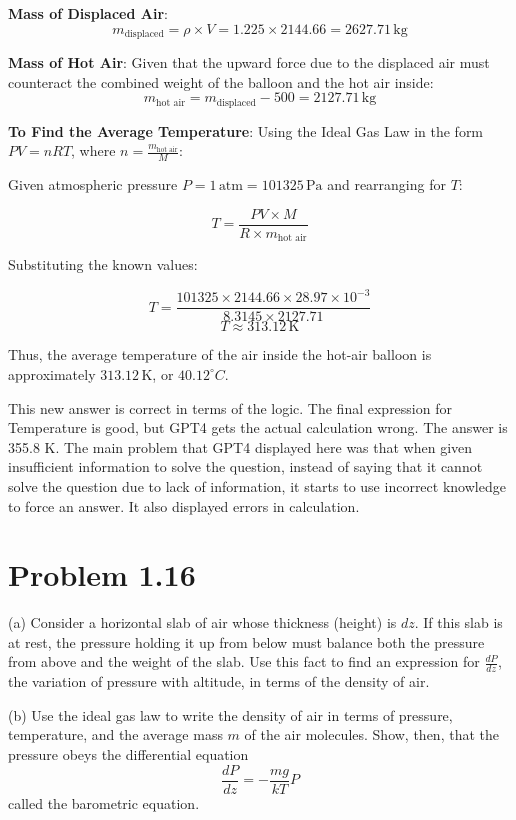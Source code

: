 \documentclass[12pt]{article}
\begin{document}
\textbf{Mass of Displaced Air}:
\[ m_{\text{displaced}} = \rho \times V = 1.225 \times 2144.66 = 2627.71 \, \text{kg} \]

\textbf{Mass of Hot Air}:
Given that the upward force due to the displaced air must counteract the combined weight of the balloon and the hot air inside:
\[ m_{\text{hot air}} = m_{\text{displaced}} - 500 = 2127.71 \, \text{kg} \]

\textbf{To Find the Average Temperature}:
Using the Ideal Gas Law in the form \( PV = nRT \), where \( n = \frac{m_{\text{hot air}}}{M} \):

Given atmospheric pressure \( P = 1 \, \text{atm} = 101325 \, \text{Pa} \) and rearranging for \( T \):

\[ T = \frac{PV \times M}{R \times m_{\text{hot air}}} \]

Substituting the known values:

\[ T = \frac{101325 \times 2144.66 \times 28.97 \times 10^{-3}}{8.3145 \times 2127.71} \]
\[ T \approx 313.12 \, \text{K} \]

Thus, the average temperature of the air inside the hot-air balloon is approximately \( 313.12 \, \text{K} \), or \( 40.12^\circ C \).


This new answer is correct in terms of the logic. The final expression for Temperature is good, but GPT4 gets the actual calculation wrong. The answer is 355.8 K. The main problem that GPT4 displayed here was that when given insufficient information to solve the question, instead of saying that it cannot solve the question due to lack of information, it starts to use incorrect knowledge to force an answer. It also displayed errors in calculation. 

\section*{Problem 1.16}

(a) Consider a horizontal slab of air whose thickness (height) is \( dz \). If this slab is at rest, the pressure holding it up from below must balance both the pressure from above and the weight of the slab. Use this fact to find an expression for \( \frac{dP}{dz} \), the variation of pressure with altitude, in terms of the density of air.

(b) Use the ideal gas law to write the density of air in terms of pressure, temperature, and the average mass \( m \) of the air molecules. Show, then, that the pressure obeys the differential equation
\[
\frac{dP}{dz}=-\frac{mg}{kT}P
\]
called the barometric equation.
\end{document}
